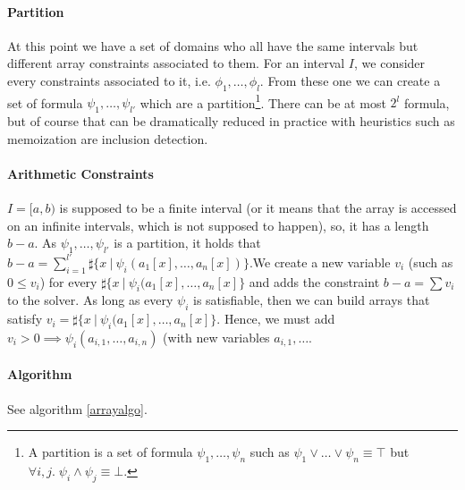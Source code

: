\documentclass[]{article}
\begin{document}
{\paragraph{Partition}\label{partition}

At this point we have a set of domains who all have the same intervals
but different array constraints associated to them. For an interval
$I$, we consider every constraints associated to it, i.e.
$\phi_1, \ldots, \phi_l$. From these one we can create a set of formula
$\psi_1, \ldots, \psi_{l'}$ which are a
partition\footnote{A partition is a set of formula $\psi_1, \ldots, \psi_n$ such as $\psi_1 \lor \ldots \lor \psi_n \equiv \top$ but $\forall i, j. \; \psi_i \land \psi_j \equiv \bot$.}.
There can be at most $2^l$ formula, but of course that can be
dramatically reduced in practice with heuristics such as memoization are
inclusion detection.

\paragraph{Arithmetic Constraints}\label{arithmetic-constraints}

$I = [a, b)$ is supposed to be a finite interval (or it means that the
array is accessed on an infinite intervals, which is not supposed to
happen), so, it has a length $b - a$. As $\psi_1, \ldots, \psi_{l'}$ is a
partition, it holds that
$b - a = \sum\limits_{i = 1}^{l'} \sharp\{x \ |\ \psi_i(a_1[x], \ldots, a_n[x])\}$.We
create a new variable $v_i$ (such as $0 \le v_i$) for every
$\sharp\{x\ |\ \psi_i(a_1[x], \ldots, a_n[x]\}$ and adds the constraint
$b - a = \sum v_i$ to the solver. As long as every $\psi_i$ is
satisfiable, then we can build arrays that satisfy
$v_i = \sharp\{x\ |\ \psi_i(a_1[x], \ldots, a_n[x]\}$. Hence, we must add
$v_i > 0 \implies \psi_i(a_{i, 1}, \ldots, a_{i, n})$ (with new variables
$a_{i, 1}, \ldots$.

\paragraph{Algorithm}\label{algorithm-1}

See algorithm \ref{arrayalgo}.

}
\end{document}
